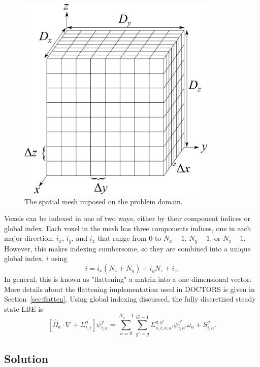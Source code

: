 \begin{figure}[tb]
  \begin{center}
   \includegraphics[width=3.75in]{figs/spatial_disc}
  \end{center}
  \caption{The spatial mesh imposed on the problem domain.}
\label{fig:spatial_disc}
\end{figure}

Voxels can be indexed in one of two ways, either by their component indices or global index. Each voxel in the mesh has three components indices, one in each major direction, $i_x$, $i_y$, and $i_z$ that range from 0 to $N_x - 1$, $N_y - 1$, or $N_z-1$. However, this makes indexing cumbersome, so they are combined into a unique global index, $i$ using 
\begin{equation} \label{eq:indx_flat}
i = i_x (N_z + N_y) + i_y N_z + i_z.
\end{equation}
In general, this is known as "flattening" a matrix into a one-dimensional vector. More details about the flattening implementation used in DOCTORS is given in Section~\ref{sec:flatten}. Using global indexing discussed, the fully discretized steady state LBE is
\begin{equation} \label{eq:boltz_i}
\left[ \hat{\Omega}_a \cdot \nabla + \Sigma_{t,i}^g \right]
\psi_{i,a}^{g} = 
\sum_{a=0}^{N_a-1} \sum_{g'=g}^{G-1} \Sigma_{s, i, a, a'}^{g, g'} \psi_{i, a'}^{g'} \omega_a + S_{i,a}^g.
\end{equation}

\subsection{Solution}

